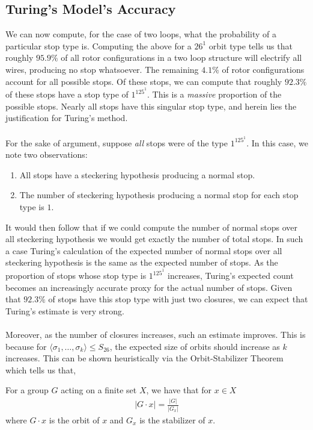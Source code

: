 \subsection{Turing's Model's Accuracy}\label{justify_turing}
We can now compute, for the case of two loops, what the probability of
a particular stop type is. Computing the above for a $26^1$ orbit
type tells us that roughly $95.9\%$ of all rotor configurations
in a two loop structure will electrify all wires, producing no stop
whatsoever. The remaining $4.1\%$ of rotor configurations account for
all possible stops. Of these stops, we can compute that roughly
$92.3\%$ of these stops have a stop type of $1^125^1$. This is a
\emph{massive} proportion of the possible stops. Nearly all stops
have this singular stop type, and herein lies the justification for
Turing's method.
\\\\For the sake of argument, suppose \emph{all} stops were of the
type $1^125^1$. In this case, we note two observations:
\begin{enumerate}[(1)]
  \item All stops have a steckering hypothesis producing a normal stop.
  \item The number of steckering hypothesis producing a normal stop
    for each stop type is $1$.
\end{enumerate}
It would then follow that if we could compute the number of normal
stops over all steckering hypothesis we would get exactly the number
of total stops. In such a case Turing's calculation of the expected
number of normal stops over all steckering hypothesis is the same as
the expected number of stops. As the proportion of stops whose stop
type is $1^125^1$ increases, Turing’s expected count becomes an
increasingly accurate proxy for the actual number of stops. Given
that $92.3\%$ of stops have this stop
type with just two closures, we can expect that Turing's estimate is
very strong.
\\\\Moreover, as the number of closures increases, such an estimate improves.
This is because for $\langle \sigma_1, \dots, \sigma_k\rangle\le
S_{26}$, the expected size of orbits should increase as $k$
increases. This can be shown heuristically via the Orbit-Stabilizer Theorem~\cite{OrbitStabilizer} which tells us that,
\begin{theorem}
  For a group $G$ acting on a finite set $X$, we have that for $x\in X$
  \begin{align*}
    |G\cdot x| = \frac{|G|}{|G_x|}
  \end{align*}
  where $G\cdot x$ is the orbit of $x$ and $G_x$ is the stabilizer of $x$.
\end{theorem}

